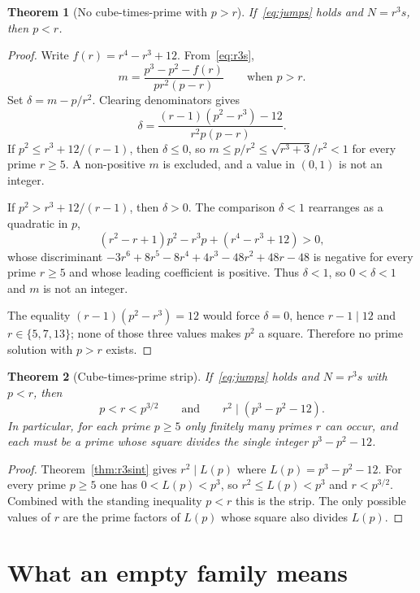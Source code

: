 \documentclass[11pt,reqno]{amsart}
\newtheorem{theorem}{Theorem}
\theoremstyle{definition}
\begin{document}
\begin{theorem}[No cube-times-prime with \(p>r\)]
\label{thm:r3s-plarge}
If~\eqref{eq:jumps} holds and \(N=r^3s\), then \(p<r\).
\end{theorem}

\begin{proof}
Write \(f(r)=r^4-r^3+12\). From~\eqref{eq:r3s},
\[
m=\frac{p^3-p^2-f(r)}{pr^2(p-r)}\qquad\text{when \(p>r\)}.
\]
Set \(\delta=m-p/r^2\). Clearing denominators gives
\[
\delta=\frac{(r-1)(p^2-r^3)-12}{r^2p(p-r)}.
\]
If \(p^2\le r^3+12/(r-1)\), then \(\delta\le 0\), so \(m\le p/r^2\le\sqrt{r^3+3}/r^2<1\) for every prime \(r\ge 5\). A non-positive \(m\) is excluded, and a value in \((0,1)\) is not an integer.

If \(p^2>r^3+12/(r-1)\), then \(\delta>0\). The comparison \(\delta<1\) rearranges as a quadratic in \(p\),
\[
(r^2-r+1)p^2-r^3p+(r^4-r^3+12)>0,
\]
whose discriminant \(-3r^6+8r^5-8r^4+4r^3-48r^2+48r-48\) is negative for every prime \(r\ge 5\) and whose leading coefficient is positive. Thus \(\delta<1\), so \(0<\delta<1\) and \(m\) is not an integer.

The equality \((r-1)(p^2-r^3)=12\) would force \(\delta=0\), hence \(r-1\mid 12\) and \(r\in\{5,7,13\}\); none of those three values makes \(p^2\) a square. Therefore no prime solution with \(p>r\) exists.
\end{proof}

\begin{theorem}[Cube-times-prime strip]
\label{thm:r3s-strip}
If~\eqref{eq:jumps} holds and \(N=r^3s\) with \(p<r\), then
\[
p<r<p^{3/2}\qquad\text{and}\qquad r^2\mid(p^3-p^2-12).
\]
In particular, for each prime \(p\ge 5\) only finitely many primes \(r\) can occur, and each must be a prime whose square divides the single integer \(p^3-p^2-12\).
\end{theorem}

\begin{proof}
Theorem~\ref{thm:r3sint} gives \(r^2\mid L(p)\) where \(L(p)=p^3-p^2-12\). For every prime \(p\ge 5\) one has \(0<L(p)<p^3\), so \(r^2\le L(p)<p^3\) and \(r<p^{3/2}\). Combined with the standing inequality \(p<r\) this is the strip. The only possible values of \(r\) are the prime factors of \(L(p)\) whose square also divides \(L(p)\).
\end{proof}

\section{What an empty family means}
\label{sec:empty}
\end{document}
